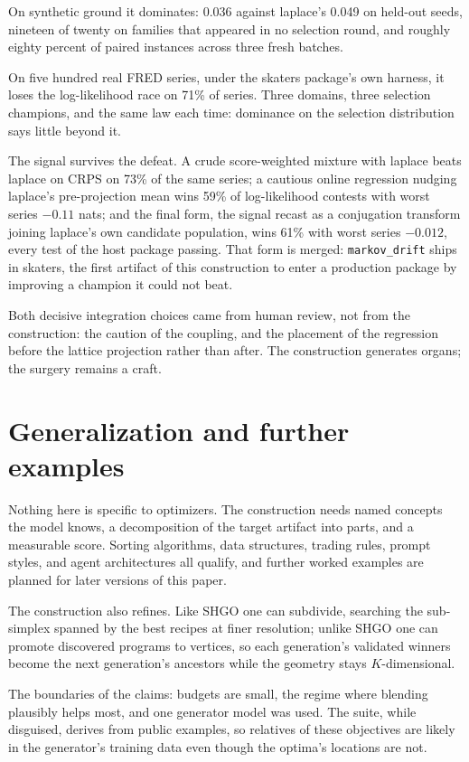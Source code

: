 \documentclass[11pt]{article}
\begin{document}
On synthetic ground it dominates: 0.036 against laplace's 0.049 on held-out
seeds, nineteen of twenty on families that appeared in no selection round,
and roughly eighty percent of paired instances across three fresh batches.

On five hundred real FRED series, under the skaters package's own harness,
it loses the log-likelihood race on 71\% of series. Three domains, three
selection champions, and the same law each time: dominance on the
selection distribution says little beyond it.

The signal survives the defeat. A crude score-weighted mixture with laplace
beats laplace on CRPS on 73\% of the same series; a cautious online
regression nudging laplace's pre-projection mean wins 59\% of
log-likelihood contests with worst series $-0.11$ nats; and the final
form, the signal recast as a conjugation transform joining laplace's own
candidate population, wins 61\% with worst series $-0.012$, every test of
the host package passing. That form is merged: \texttt{markov\_drift}
ships in skaters, the first artifact of this construction to enter a
production package by improving a champion it could not beat.

Both decisive integration choices came from human review, not from the
construction: the caution of the coupling, and the placement of the
regression before the lattice projection rather than after. The
construction generates organs; the surgery remains a craft.

\section{Generalization and further examples}

Nothing here is specific to optimizers. The construction needs named
concepts the model knows, a decomposition of the target artifact into
parts, and a measurable score. Sorting algorithms, data structures, trading
rules, prompt styles, and agent architectures all qualify, and further
worked examples are planned for later versions of this paper.

The construction also refines. Like SHGO one can subdivide, searching the
sub-simplex spanned by the best recipes at finer resolution; unlike SHGO
one can promote discovered programs to vertices, so each generation's
validated winners become the next generation's ancestors while the geometry
stays $K$-dimensional.

The boundaries of the claims: budgets are small, the regime where blending
plausibly helps most, and one generator model was used. The suite, while
disguised, derives from public examples, so relatives of these objectives
are likely in the generator's training data even though the optima's
locations are not.
\end{document}

